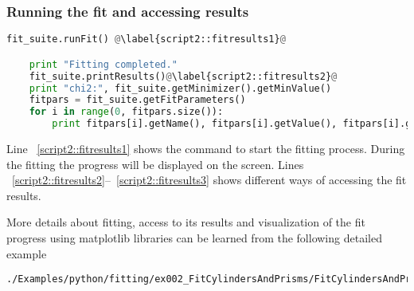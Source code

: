 \subsubsection*{Running the fit and accessing results}
\begin{lstlisting}[language=python, style=eclipseboxed, firstnumber=66]
    fit_suite.runFit() @\label{script2::fitresults1}@

    print "Fitting completed."
    fit_suite.printResults()@\label{script2::fitresults2}@
    print "chi2:", fit_suite.getMinimizer().getMinValue() 
    fitpars = fit_suite.getFitParameters()
    for i in range(0, fitpars.size()):
        print fitpars[i].getName(), fitpars[i].getValue(), fitpars[i].getError() @\label{script2::fitresults3}@
\end{lstlisting}
Line ~\ref{script2::fitresults1} shows the command to start the fitting process.
During the fitting the progress will be displayed on the screen.
Lines ~\ref{script2::fitresults2}--~\ref{script2::fitresults3} shows different ways of
accessing the fit results.


More details about fitting, access to its results and visualization of
the fit progress using matplotlib libraries can be learned from the
following detailed example
\begin{lstlisting}[language=shell, style=commandline]
./Examples/python/fitting/ex002_FitCylindersAndPrisms/FitCylindersAndPrisms_detailed.py
\end{lstlisting}

